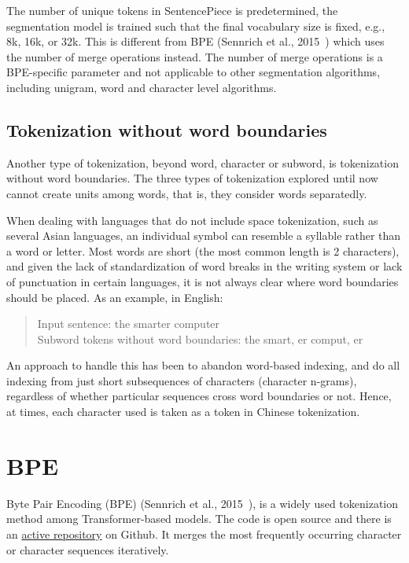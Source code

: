 The number of unique tokens in SentencePiece is predetermined, the segmentation model is trained such that the final vocabulary size is fixed, e.g., 8k, 16k, or 32k. This is different from BPE (Sennrich et al., 2015~\cite{sennrich2015neural}) which uses the number of merge operations instead. The number of merge operations is a BPE-specific parameter and not applicable to other segmentation algorithms, including unigram, word and character level algorithms.

\subsection{Tokenization without word boundaries}\label{subsec:wordtokwowb}

Another type of tokenization, beyond word, character or subword, is tokenization without word boundaries. The three types of tokenization explored until now cannot create units among words, that is, they consider words separatedly.

When dealing with languages that do not include space tokenization, such as several Asian languages, an individual symbol can resemble a syllable rather than a word or letter. Most words are short (the most common length is 2 characters), and given the lack of standardization of word breaks in the writing system or lack of punctuation in certain languages, it is not always clear where word boundaries should be placed. As an example, in English:

\begin{quote}
    Input sentence: the smarter computer\\
    Subword tokens without word boundaries: the smart, er comput, er
\end{quote}

An approach to handle this has been to abandon word-based indexing, and do all indexing from just short subsequences of characters (character n-grams), regardless of whether particular sequences cross word boundaries or not. Hence, at times, each character used is taken as a token in Chinese tokenization.

\section{BPE}

Byte Pair Encoding (BPE) (Sennrich et al., 2015~\cite{sennrich2015neural}), is a widely used tokenization method among Transformer-based models. The code is open source and there is an \href{https://github.com/rsennrich/subword-nmt}{active repository} on Github. It merges the most frequently occurring character or character sequences iteratively.

